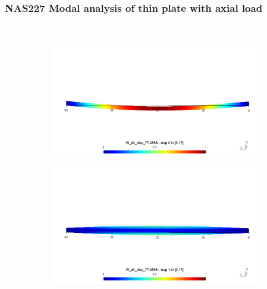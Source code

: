 \documentclass[9pt]{beamer}
\begin{document}

\begin{frame}
\frametitle{NAS227 Modal analysis of thin plate with axial load}

\begin{columns}

\begin{figure}[h!]
\centering
\begin{subfigure}{1\textwidth}
\includegraphics[width=\linewidth,trim={0 8cm 0 8cm},clip]{NAS277_pos_1.png}
\end{subfigure} \vfill
\begin{subfigure}{1\textwidth}
\includegraphics[width=\linewidth,trim={0 8cm 0 8cm},clip]{NAS277_pos_2.png}

\end{subfigure}
\end{figure}
\end{columns}
\end{frame}
\end{document}
